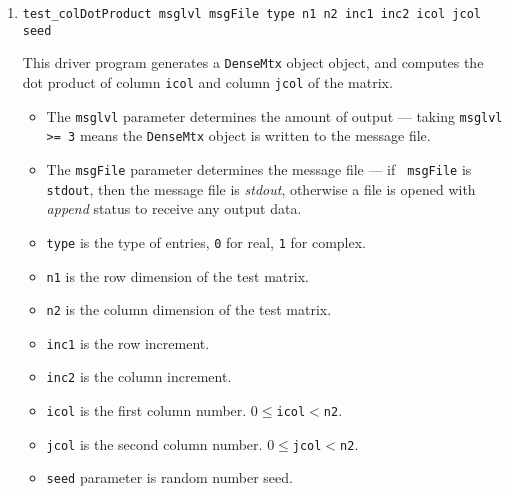 \begin{enumerate}
\item
\begin{verbatim}
test_colDotProduct msglvl msgFile type n1 n2 inc1 inc2 icol jcol seed 
\end{verbatim}
This driver program generates a {\tt DenseMtx} object
object, and  computes the dot product 
of column {\tt icol} and column {\tt jcol} of the matrix.  
\par
\begin{itemize}
\item
The {\tt msglvl} parameter determines the amount of output ---
taking {\tt msglvl >= 3} means the {\tt DenseMtx} object is written
to the message file.
\item
The {\tt msgFile} parameter determines the message file --- if {\tt
msgFile} is {\tt stdout}, then the message file is {\it stdout},
otherwise a file is opened with {\it append} status to receive any
output data.
\item
{\tt type} is the type of entries, {\tt 0} for real, {\tt 1} for complex.
\item
{\tt n1} is the row dimension of the test matrix.
\item
{\tt n2} is the column dimension of the test matrix.
\item
{\tt inc1} is the row increment.
\item
{\tt inc2} is the column increment.
\item
{\tt icol} is the first column number.  $0\leq${\tt icol}$<${\tt n2}.
\item
{\tt jcol} is the second column number.  $0\leq${\tt jcol}$<${\tt n2}.
\item
{\tt seed} parameter is random number seed.
\end{itemize}


\end{enumerate}
